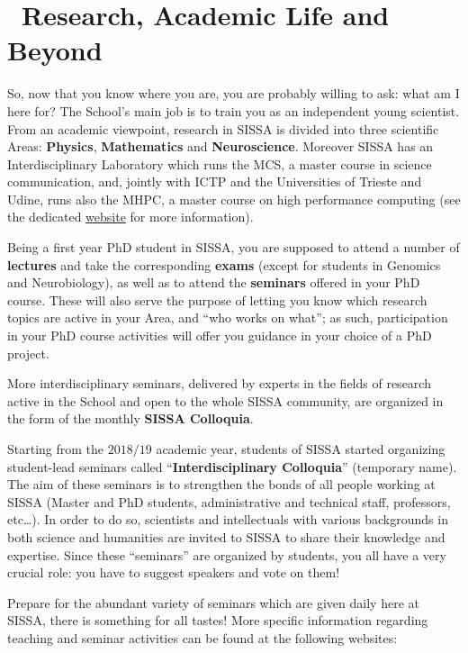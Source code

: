 \documentclass{sissavademecum}
\begin{document}
\chapter{\texorpdfstring{\faGraduationCap\ }{}Research, Academic Life and Beyond}

So, now that you know where you are, you are probably willing to ask: what am I here for? The School's main job is to train you as an independent young scientist. From an academic viewpoint, research in SISSA is divided into three scientific Areas: \textbf{Physics}, \textbf{Mathematics} and \textbf{Neuroscience}. Moreover SISSA has an Interdisciplinary Laboratory which runs the MCS, a master course in science communication, and, jointly with ICTP and the Universities of Trieste and Udine, runs also the MHPC, a master course on high performance computing (see the dedicated \href{https://www.sissa.it/ilas/}{website} for more information).

Being a first year PhD student in SISSA, you are supposed to attend a number of\textbf{ lectures }and take the corresponding \textbf{exams} (except for students in Genomics and Neurobiology), as well as to attend the \textbf{seminars} offered in your PhD course. These will also serve the purpose of letting you know which research topics are active in your Area, and ``who works on what''; as such, participation in your PhD course activities will offer you guidance in your choice of a PhD project.

More interdisciplinary seminars, delivered by experts in the fields of research active in the School and open to the whole SISSA community, are organized in the form of the monthly \textbf{SISSA Colloquia}.

Starting from the $2018/19$ academic year, students of SISSA started organizing student-lead seminars called ``\textbf{Interdisciplinary Colloquia}'' (temporary name). The aim of these seminars is to strengthen the bonds of all people working at SISSA (Master and PhD students, administrative and technical staff, professors, etc\dots). In order to do so, scientists and intellectuals with various backgrounds in both science and humanities are invited to SISSA to share their knowledge and expertise. Since these ``seminars'' are organized by students, you all have a very crucial role: you have to suggest speakers and vote on them!

Prepare for the abundant variety of seminars which are given daily here at SISSA, there is something for all tastes! More specific information regarding teaching and seminar activities can be found at the following websites:
\end{document}
